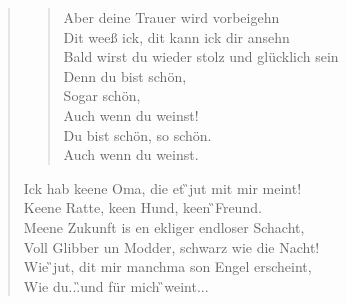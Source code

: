 \documentclass[a4paper,oneside, onecolumn]{article}
\begin{document}
\begin{small}
\begin{verse}
\begin{verse}
Aber deine Trauer wird vorbeigehn\\
Dit weeß ick, dit kann ick dir ansehn\\
Bald wirst du wieder stolz und glücklich sein\\
Denn du bist schön,\\
Sogar schön,\\
Auch wenn du weinst!\\
Du bist schön, so schön.\\
Auch wenn du weinst.\\
\end{verse}

Ick \D{}hab keene Oma, die et \G{}jut mit mir meint!\\
Keene \D{}Ratte, keen Hund, keen \G{}Freund.\\
Meene \HH{}Zukunft is en \Hs{}ekliger \Em{}endloser Schacht,\\
Voll \C{}Glibber un Modder, \D{}schwarz wie die Nacht!\\

Wie \G{}jut, dit mir manchma son \C{}Engel erscheint,\\
Wie \D{}du...\qquad\C{}\qquad\G{}\qquad\D{}\qquad{}und für mich \G{}weint...\\
\end{verse}
\end{small}
\end{document}
